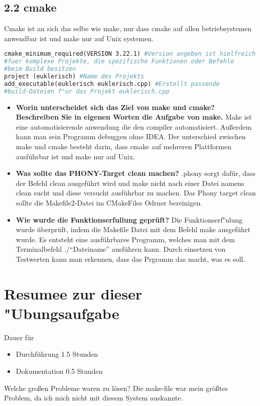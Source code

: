 \documentclass[a4paper,11pt,titlepage]{article}
\begin{document}
\subsection{2.2 cmake}
Cmake ist an sich das selbe wie make, nur dass cmake auf allen betriebsystemen anwendbar ist und make nur auf Unix systemen. \newline
\begin{lstlisting}[language=make]
cmake_minimum_required(VERSION 3.22.1) #Version angeben ist hielfreich 
#fuer komplexe Projekte, die spezifische Funktionen oder Befehle
#beim Build besitzen
project (euklerisch) #Name des Projekts
add_executable(euklerisch euklerisch.cpp) #Erstellt passende
#build-Dateien f"ur das Projekt euklerisch.cpp
\end{lstlisting}
\begin{itemize}
  \item \textbf{Worin unterscheidet sich das Ziel von make und cmake? Beschreiben Sie in eigenen Worten die Aufgabe von make.} \newline
        Make ist eine automatisierende anwendung die den compiler automatisiert. Außerdem kann man sein Programm debuggen ohne IDEA. \newline
        Der unterschied zwischen make und cmake besteht darin, dass cmake auf mehreren Plattformen ausführbar ist und make nur auf Unix.
  \item \textbf{Was sollte das PHONY-Target clean machen? }\newline
        .phony sorgt daf\"ur, dass der Befehl clean ausgef\"uhrt wird und make nicht nach einer Datei namens clean sucht und diese versucht ausf\"uhrbar zu machen.
        Das Phony target clean sollte die Makefile2-Datei im CMakeFiles Odrner bereinigen.
  \item \textbf{Wie wurde die Funktionserfullung gepr\"uft?}\newline
        Die Funktionserf"ulung wurde \"uberpr\"uft, indem die Makefile Datei mit dem Befehl make ausgef\"uhrt wurde.
        Es entsteht eine ausf\"uhrbares Programm, welches man mit dem Terminalbefehl  ./"`Dateiname"' ausf\"uhren kann.
        Durch einsetzen von Testwerten kann man erkennen, dass das Prgramm das macht, was es soll.
\end{itemize}
\section{Resumee zur dieser "Ubungsaufgabe}
Dauer f\"ur 
\begin{itemize}
	\item Durchf\"uhrung 1.5 Stunden
	\item Dokumentation 0.5 Stunden
\end{itemize}
Welche großen Probleme waren zu l\"osen?
Die make-file war mein gr\"oßtes Problem, da ich mich nicht mit diesem System auskannte.
\end{document}
